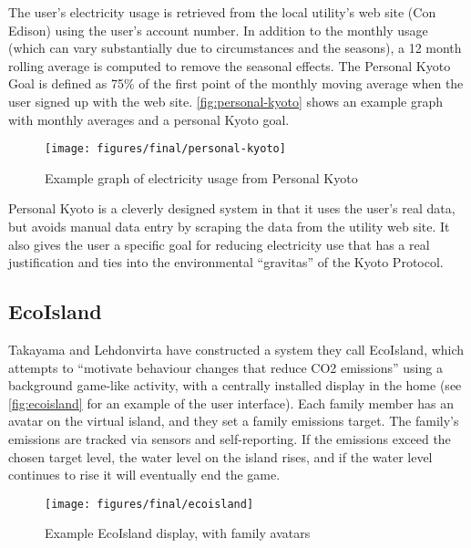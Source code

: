 The user's electricity usage is retrieved from the local utility's web site (Con Edison) using the user's account number. In addition to the monthly usage (which can vary substantially due to circumstances and the seasons), a 12 month rolling average is computed to remove the seasonal effects. The Personal Kyoto Goal is defined as 75\% of the first point of the monthly moving average when the user signed up with the web site. \autoref{fig:personal-kyoto} shows an example graph with monthly averages and a personal Kyoto goal.

\begin{figure}[htbp]
	\begin{center}
		\texttt{[image: figures/final/personal-kyoto]}
		\caption{Example graph of electricity usage from Personal Kyoto}
		\label{fig:personal-kyoto}
 	\end{center}
\end{figure}

Personal Kyoto is a cleverly designed system in that it uses the user's real data, but avoids manual data entry by scraping the data from the utility web site. It also gives the user a specific goal for reducing electricity use that has a real justification and ties into the environmental ``gravitas'' of the Kyoto Protocol.

\subsection{EcoIsland}
\label{ecoisland}

Takayama and Lehdonvirta have constructed a system they call EcoIsland, which attempts to ``motivate behaviour changes that reduce CO2 emissions'' using a background game-like activity, with a centrally installed display in the home \cite{takayama-2008} (see \autoref{fig:ecoisland} for an example of the user interface). Each family member has an avatar on the virtual island, and they set a family \COtwo emissions target. The family's emissions are tracked via sensors and self-reporting. If the emissions exceed the chosen target level, the water level on the island rises, and if the water level continues to rise it will eventually end the game.

\begin{figure}[htb]
	\begin{center}
		\texttt{[image: figures/final/ecoisland]}
		\caption{Example EcoIsland display, with family avatars}
		\label{fig:ecoisland}
 	\end{center}
\end{figure}

